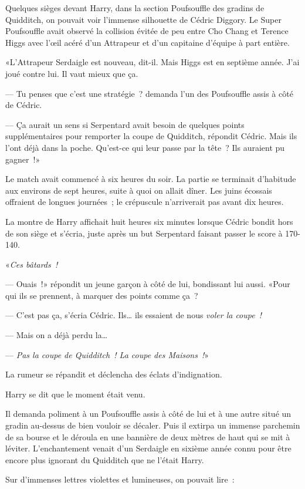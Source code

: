 Quelques sièges devant Harry, dans la section Poufsouffle des gradins de Quidditch, on pouvait voir l'immense silhouette de Cédric Diggory. Le Super Poufsouffle avait observé la collision évitée de peu entre Cho Chang et Terence Higgs avec l'œil acéré d'un Attrapeur et d'un capitaine d'équipe à part entière.

«L'Attrapeur Serdaigle est nouveau, dit-il. Mais Higgs est en septième année. J'ai joué contre lui. Il vaut mieux que ça.

--- Tu penses que c'est une stratégie~? demanda l'un des Poufsouffle assis à côté de Cédric.

--- Ça aurait un sens si Serpentard avait besoin de quelques points supplémentaires pour remporter la coupe de Quidditch, répondit Cédric. Mais ils l'ont déjà dans la poche. Qu'est-ce qui leur passe par la tête~? Ils auraient pu gagner~!»

Le match avait commencé à six heures du soir. La partie se terminait d'habitude aux environs de sept heures, suite à quoi on allait dîner. Les juins écossais offraient de longues journées~; le crépuscule n'arriverait pas avant dix heures.

La montre de Harry affichait huit heures six minutes lorsque Cédric bondit hors de son siège et s'écria, juste après un but Serpentard faisant passer le score à 170-140.

«\emph{Ces bâtards~!}

--- Ouais~!» répondit un jeune garçon à côté de lui, bondissant lui aussi. «Pour qui ils se prennent, à marquer des points comme ça~?

--- C'est pas ça, s'écria Cédric. Ils… ils essaient de nous \emph{voler la coupe~!}

--- Mais on a déjà perdu la…

--- \emph{Pas la coupe de Quidditch~! La coupe des Maisons~!}»

La rumeur se répandit et déclencha des éclats d'indignation.

Harry se dit que le moment était venu.

Il demanda poliment à un Poufsouffle assis à côté de lui et à une autre situé un gradin au-dessus de bien vouloir se décaler. Puis il extirpa un immense parchemin de sa bourse et le déroula en une bannière de deux mètres de haut qui se mit à léviter. L'enchantement venait d'un Serdaigle en sixième année connu pour être encore plus ignorant du Quidditch que ne l'était Harry.

Sur d'immenses lettres violettes et lumineuses, on pouvait lire~:

